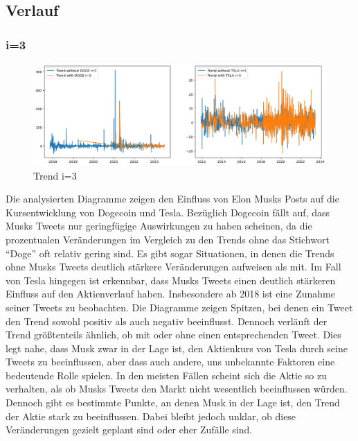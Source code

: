 \documentclass{article}
\begin{document}
\newpage



\subsection{Verlauf}
\subsubsection{i=3}
\begin{figure}[!htb]
  	\includegraphics[width=\textwidth, center]{../imgs/Trendi3.png}
 	\caption{Trend i=3}
 	\label{fig:Trendi3}
\end{figure}
Die analysierten Diagramme zeigen den Einfluss von Elon Musks Posts auf die Kursentwicklung von Dogecoin und Tesla. Bezüglich Dogecoin fällt auf, dass Musks Tweets nur geringfügige Auswirkungen zu haben scheinen, da die prozentualen Veränderungen im Vergleich zu den Trends ohne das Stichwort ``Doge'' oft relativ gering sind. Es gibt sogar Situationen, in denen die Trends ohne Musks Tweets deutlich stärkere Veränderungen aufweisen als mit.
Im Fall von Tesla hingegen ist erkennbar, dass Musks Tweets einen deutlich stärkeren Einfluss auf den Aktienverlauf haben. Insbesondere ab 2018 ist eine Zunahme seiner Tweets zu beobachten. Die Diagramme zeigen Spitzen, bei denen ein Tweet den Trend sowohl positiv als auch negativ beeinflusst. Dennoch verläuft der Trend größtenteils ähnlich, ob mit oder ohne einen entsprechenden Tweet. Dies legt nahe, dass Musk zwar in der Lage ist, den Aktienkurs von Tesla durch seine Tweets zu beeinflussen, aber dass auch andere, uns unbekannte Faktoren eine bedeutende Rolle spielen.
In den meisten Fällen scheint sich die Aktie so zu verhalten, als ob Musks Tweets den Markt nicht wesentlich beeinflussen würden. Dennoch gibt es bestimmte Punkte, an denen Musk in der Lage ist, den Trend der Aktie stark zu beeinflussen. Dabei bleibt jedoch unklar, ob diese Veränderungen gezielt geplant sind oder eher Zufälle sind.
\end{document}
